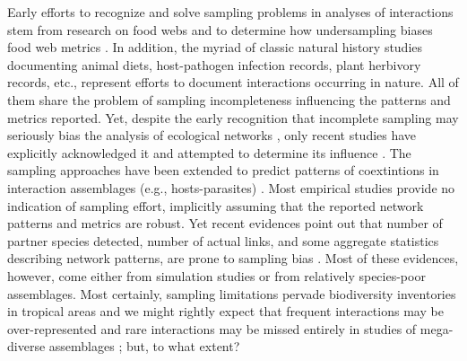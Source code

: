 \documentclass[12pt]{article}
\begin{document}
Early efforts to recognize and solve sampling problems in analyses of interactions stem from research on food webs and to determine how undersampling biases food web metrics \citep{Martinez:1991aa,Cohen:1993aa,Martinez:1993ti,Bersier:2002p9371,Brose:2003wv,BanasekRichter:2004ik,Wells:2012dy}. In addition, the myriad of classic natural history studies documenting animal diets, host-pathogen infection records, plant herbivory records, etc., represent efforts to document interactions occurring in nature. All of them share the problem of sampling incompleteness influencing the patterns and metrics reported. Yet, despite the early recognition that incomplete sampling may seriously bias the analysis of ecological networks \citep{E31/2562}, only recent studies have explicitly acknowledged it and attempted to determine its influence \citep{Ollerton:2002jw,Nielsen:2007,Vazquez:2009p82,Gibson:2011eh,Olesen:2011a,Chacoff:2012,RiveraHutinel:2012vn,Olito:2014gc,Bascompte:2014to,Vizentin-Bugoni:2014hc,Vizentin-Bugoni:2016aa,Frund:2015ii}. The sampling approaches have been extended to predict patterns of coextintions in interaction assemblages (e.g., hosts-parasites) \citep{Colwell:2012fc}. Most empirical studies provide no indication of sampling effort, implicitly assuming that the reported network patterns and metrics are robust. Yet recent evidences point out that number of partner species detected, number of actual links, and some aggregate statistics describing network patterns, are prone to sampling bias \citep{Nielsen:2007,Dorado:2011cf,Olesen:2011a,Chacoff:2012,RiveraHutinel:2012vn,Olito:2014gc,Frund:2015ii}. Most of these evidences, however, come either from simulation studies \citep{Frund:2015ii} or from relatively species-poor assemblages. Most certainly, sampling limitations pervade biodiversity inventories in tropical areas \citep{Coddington:2009fi} and we might rightly expect that frequent interactions may be over-represented and rare interactions may be missed entirely in studies of mega-diverse assemblages \citep{Bascompte:2014to}; but, to what extent? 

\end{document}
